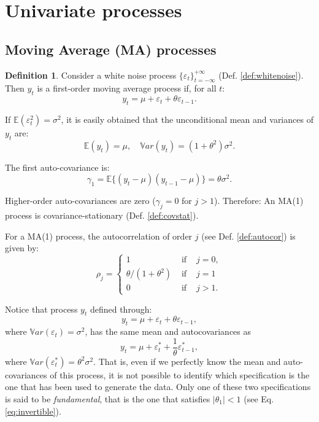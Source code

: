 \documentclass[
  12pt,
]{book}
\theoremstyle{definition}
\newtheorem{definition}{Definition}[chapter]
\theoremstyle{definition}
\theoremstyle{definition}
\theoremstyle{definition}
\theoremstyle{remark}
\begin{document}
\hypertarget{univariate-processes}{%
\section{Univariate processes}\label{univariate-processes}}

\hypertarget{moving-average-ma-processes}{%
\subsection{Moving Average (MA) processes}\label{moving-average-ma-processes}}

\begin{definition}
Consider a white noise process \(\{\varepsilon_t\}_{t = -\infty}^{+\infty}\) (Def. \ref{def:whitenoise}). Then \(y_t\) is a first-order moving average process if, for all \(t\):
\[
y_t = \mu + \varepsilon_t + \theta \varepsilon_{t-1}.
\]
\end{definition}

If \(\mathbb{E}(\varepsilon_t^2)=\sigma^2\), it is easily obtained that the unconditional mean and variances of \(y_t\) are:
\[
\mathbb{E}(y_t) = \mu, \quad \mathbb{V}ar(y_t) = (1+\theta^2)\sigma^2.
\]

The first auto-covariance is:
\[
\gamma_1=\mathbb{E}\{(y_t - \mu)(y_{t-1} - \mu)\} = \theta \sigma^2.
\]

Higher-order auto-covariances are zero (\(\gamma_j=0\) for \(j>1\)). Therefore: An MA(1) process is covariance-stationary (Def. \ref{def:covstat}).

For a MA(1) process, the autocorrelation of order \(j\) (see Def. \ref{def:autocor}) is given by:
\[
\rho_j =
\left\{
\begin{array}{lll}
1 &\mbox{ if }& j=0,\\
\theta / (1 + \theta^2) &\mbox{ if }& j = 1\\
0 &\mbox{ if }& j>1.
\end{array}
\right.
\]

Notice that process \(y_t\) defined through:
\[
y_t = \mu + \varepsilon_t +\theta \varepsilon_{t-1}, 
\]
where \(\mathbb{V}ar(\varepsilon_t)=\sigma^2\), has the same mean and autocovariances as
\[
y_t = \mu + \varepsilon^*_t +\frac{1}{\theta}\varepsilon^*_{t-1},
\]
where \(\mathbb{V}ar(\varepsilon^*_t)=\theta^2\sigma^2\). That is, even if we perfectly know the mean and auto-covariances of this process, it is not possible to identify which specification is the one that has been used to generate the data. Only one of these two specifications is said to be \emph{fundamental}, that is the one that satisfies \(|\theta_1|<1\) (see Eq. \eqref{eq:invertible}).
\end{document}
